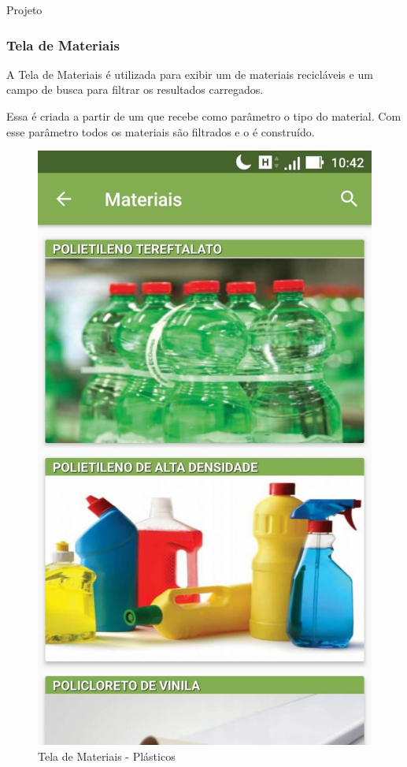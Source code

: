 \documentclass[
	12pt,				%
	openany,			%
	twoside,			%
	a4paper,			%
	english,			%
	french,				%
	spanish,			%
	brazil				%
	]{abntex2}
\begin{document}
\begin{chapter}{Projeto}
\newpage
\subsubsection{Tela de Materiais} \label{ActivityMaterial}
A Tela de Materiais é utilizada para exibir um  de materiais recicláveis e um campo de busca para filtrar os resultados carregados.

Essa  é criada a partir de um  que recebe como parâmetro o tipo do material. Com esse parâmetro todos os materiais são filtrados e o  é construído.

    \begin{figure}[htb]    
 \centering
  \begin{minipage}{0.45\textwidth}
    \centering
    \caption{Tela de Materiais -  Plásticos}
    \includegraphics[scale=0.35]{media/tela_material_act_1.jpg}

\end{minipage}
\end{figure}
\end{chapter}
\end{document}
